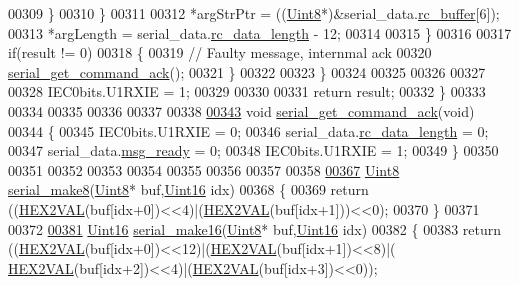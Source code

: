 \begin{DoxyCode}
00309                 \}
00310             \}
00311 
00312             *argStrPtr =  ((\hyperlink{a00070_af84840501dec18061d18a68c162a8fa2}{Uint8}*)&serial\_data.\hyperlink{a00028_ac734cb8be27f86bd99edc539434883a4}{rc\_buffer}[6]);
00313             *argLength = serial\_data.\hyperlink{a00028_ab136d4fef2c523afd55b6ca74c46d7cc}{rc\_data\_length} - 12;
00314 
00315        \}
00316 
00317        \textcolor{keywordflow}{if}(result != 0)
00318        \{
00319             \textcolor{comment}{// Faulty message, internmal ack}
00320             \hyperlink{a00028_a7fc7421ed15d6e4516e9878e7455d715}{serial\_get\_command\_ack}();
00321        \}
00322 
00323     \}
00324 
00325 
00326 
00327 
00328     IEC0bits.U1RXIE = 1;
00329 
00330 
00331     \textcolor{keywordflow}{return} result;
00332 \}
00333 
00334 
00335 
00336 
00337 
00338 
\hypertarget{a00028_source_l00343}{}\hyperlink{a00028_a7fc7421ed15d6e4516e9878e7455d715}{00343} \textcolor{keywordtype}{void}  \hyperlink{a00028_a7fc7421ed15d6e4516e9878e7455d715}{serial\_get\_command\_ack}(\textcolor{keywordtype}{void})
00344 \{
00345     IEC0bits.U1RXIE = 0;
00346     serial\_data.\hyperlink{a00028_ab136d4fef2c523afd55b6ca74c46d7cc}{rc\_data\_length} = 0;
00347     serial\_data.\hyperlink{a00028_ac0789a6c9ab7ccd13d6f04ae31496854}{msg\_ready} = 0;
00348     IEC0bits.U1RXIE = 1;
00349 \}
00350 
00351 
00352 
00353 
00354 
00355 
00356 
00357 
00358 
\hypertarget{a00028_source_l00367}{}\hyperlink{a00028_aa76f5237babd71f1484bb2dbc6aa0f8d}{00367} \hyperlink{a00070_af84840501dec18061d18a68c162a8fa2}{Uint8}  \hyperlink{a00028_aa76f5237babd71f1484bb2dbc6aa0f8d}{serial\_make8}(\hyperlink{a00070_af84840501dec18061d18a68c162a8fa2}{Uint8}* buf,\hyperlink{a00070_a59a9f6be4562c327cbfb4f7e8e18f08b}{Uint16} idx)
00368 \{
00369     \textcolor{keywordflow}{return} ((\hyperlink{a00028_a428b04d2e2f2da2ea031a6c731660a71}{HEX2VAL}(buf[idx+0])<<4)|(\hyperlink{a00028_a428b04d2e2f2da2ea031a6c731660a71}{HEX2VAL}(buf[idx+1]))<<0);
00370 \}
00371 
00372 
\hypertarget{a00028_source_l00381}{}\hyperlink{a00028_abc17de32f14103a5be219df0d4ad9176}{00381} \hyperlink{a00070_a59a9f6be4562c327cbfb4f7e8e18f08b}{Uint16}  \hyperlink{a00028_abc17de32f14103a5be219df0d4ad9176}{serial\_make16}(\hyperlink{a00070_af84840501dec18061d18a68c162a8fa2}{Uint8}* buf,\hyperlink{a00070_a59a9f6be4562c327cbfb4f7e8e18f08b}{Uint16} idx)
00382 \{
00383     \textcolor{keywordflow}{return} ((\hyperlink{a00028_a428b04d2e2f2da2ea031a6c731660a71}{HEX2VAL}(buf[idx+0])<<12)|(\hyperlink{a00028_a428b04d2e2f2da2ea031a6c731660a71}{HEX2VAL}(buf[idx+1])<<8)|(
      \hyperlink{a00028_a428b04d2e2f2da2ea031a6c731660a71}{HEX2VAL}(buf[idx+2])<<4)|(\hyperlink{a00028_a428b04d2e2f2da2ea031a6c731660a71}{HEX2VAL}(buf[idx+3])<<0));

\end{DoxyCode}
